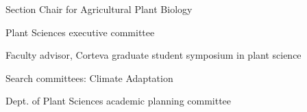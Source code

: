 \documentclass[letterpaper,10pt]{article}
\renewenvironment{itemize}{
  \begin{list}{}{
    \setlength{\leftmargin}{1.5em}
  }
}{
  \end{list}
}
\begin{document}
\begin{itemize}
\item Section Chair for Agricultural Plant Biology%
\item Plant Sciences executive committee%
\item Faculty advisor, Corteva graduate student symposium in plant science %
\item Search committees: Climate Adaptation%

\item Dept. of Plant Sciences academic planning committee%


\end{itemize}
\end{document}
